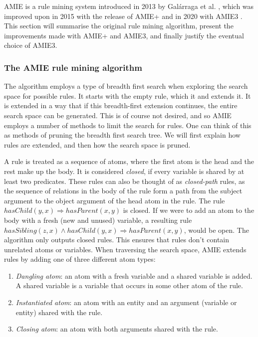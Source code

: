 AMIE is a rule mining system introduced in 2013 by Galárraga et al. \cite{amie}, which was improved upon in 2015 with the release of AMIE+ \cite{amie_plus} and in 2020 with AMIE3 \cite{amie3}. This section will summarise the original rule mining algorithm, present the improvements made with AMIE+ and AMIE3, and finally justify the eventual choice of AMIE3.

\subsubsection{The AMIE rule mining algorithm}
The algorithm employs a type of breadth first search when exploring the search space for possible rules. It starts with the empty rule, which it and extends it. It is extended in a way that if this breadth-first extension continues, the entire search space can be generated. This is of course not desired, and so AMIE employs a number of methods to limit the search for rules. One can think of this as methods of pruning the breadth first search tree. We will first explain how rules are extended, and then how the search space is pruned.

A rule is treated as a sequence of atoms, where the first atom is the head and the rest make up the body. It is considered \textit{closed}, if every variable is shared by at least two predicates. These rules can also be thought of as \textit{closed-path} rules, as the sequence of relations in the body of the rule form a path from the subject argument to the object argument of the head atom in the rule. The rule $hasChild(y, x) \Rightarrow hasParent(x, y)$ is closed. If we were to add an atom to the body with a fresh (new and unused) variable, a resulting rule $hasSibling(z, x) \wedge hasChild(y, x) \Rightarrow hasParent(x, y)$, would be open. The algorithm only outputs closed rules. This ensures that rules don't contain unrelated atoms or variables. When traversing the search space, AMIE extends rules by adding one of three different atom types:
\begin{enumerate}
    \item \textit{Dangling atom}: an atom with a fresh variable and a shared variable is added. A shared variable is a variable that occurs in some other atom of the rule.
    \item \textit{Instantiated atom}: an atom with an entity and an argument (variable or entity) shared with the rule.
    \item \textit{Closing atom}: an atom with both arguments shared with the rule.
\end{enumerate}

